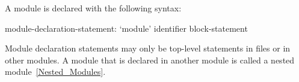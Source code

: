 A module is declared with the following syntax:
\begin{syntax}
module-declaration-statement:
  `module' identifier block-statement
\end{syntax}

Module declaration statements may only be top-level statements in
files or in other modules.  A module that is declared in another
module is called a nested module~\ref{Nested_Modules}.
